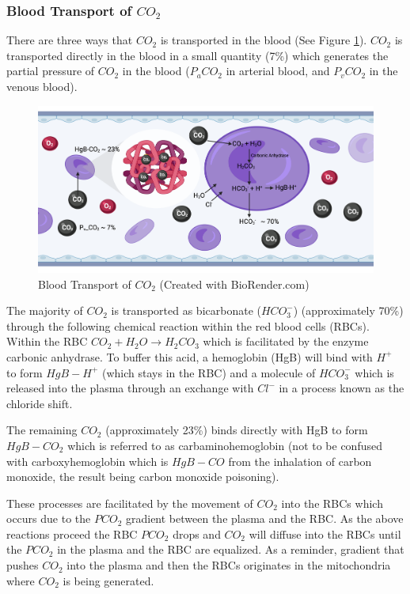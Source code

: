 \subsubsection{Blood Transport of $CO_2$}

There are three ways that $CO_2$ is transported in the blood (See Figure \ref{fig:co2_transport}). $CO_2$ is transported directly in the blood in a small quantity (7\%) which generates the partial pressure of $CO_2$ in the blood ($P_aCO_2$ in arterial blood, and $P_vCO_2$ in the venous blood). 

\begin{figure}[!h]
    \centering
    \includegraphics[width=1.0\linewidth]{./figure/co2_transport.png}
    \caption{Blood Transport of $CO_2$ \footnotesize{(Created with BioRender.com)}}
    \label{fig:co2_transport}
\end{figure}

The majority of $CO_2$ is transported as bicarbonate ($HCO_3^-$) (approximately 70\%) through the following chemical reaction within the red blood cells (RBCs). 
Within the RBC $CO_2 + H_2O \rightarrow H_2CO_3$ which is facilitated by the enzyme carbonic anhydrase. To buffer this acid, a hemoglobin (HgB) will bind with $H^+$ to form $HgB-H^+$ (which stays in the RBC) and a molecule of $HCO_3^-$ which is released into the plasma through an exchange with $Cl^-$ in a process known as the chloride shift.

The remaining $CO_2$ (approximately 23\%) binds directly with HgB to form $HgB-CO_2$ which is referred to as carbaminohemoglobin (not to be confused with carboxyhemoglobin which is $HgB-CO$ from the inhalation of carbon monoxide, the result being carbon monoxide poisoning). 

These processes are facilitated by the movement of $CO_2$ into the RBCs which occurs due to the $PCO_2$ gradient between the plasma and the RBC. As the above reactions proceed the RBC $PCO_2$ drops and $CO_2$ will diffuse into the RBCs until the $PCO_2$ in the plasma and the RBC are equalized. As a reminder, gradient that pushes $CO_2$ into the plasma and then the RBCs originates in the mitochondria where $CO_2$ is being generated.


